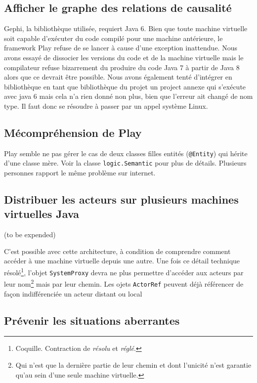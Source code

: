 \documentclass[11pt]{article}
\begin{document}
\subsection{Afficher le graphe des relations de causalité} Gephi, la bibliothèque utilisée, requiert Java 6. Bien que toute machine virtuelle soit capable d'exécuter du code compilé pour une machine antérieure, le framework Play refuse de se lancer à cause d'une exception inattendue.
Nous avons essayé de dissocier les versions du code et de la machine virtuelle mais le compilateur refuse bizarrement du produire du code Java 7 à partir de Java 8 alors que ce devrait être possible. Nous avons également tenté d'intégrer en bibliothèque en tant que bibliothèque du projet un project annexe qui s'exécute avec java 6 mais cela n'a rien donné non plus, bien que l'erreur ait changé de nom type. Il faut donc se résoudre à passer par un appel système Linux.

\subsection{Mécompréhension de Play} Play semble ne pas gérer le cas de deux classes filles entités (\texttt{@Entity}) qui hérite d'une classe mère. Voir la classe \texttt{logic.Semantic} pour plus de détails. Plusieurs personnes rapport le même problème sur internet.

\subsection{Distribuer les acteurs sur plusieurs machines virtuelles Java}

(to be expended)

C'est possible avec cette architecture, à condition de comprendre comment accéder à une machine virtuelle depuis une autre. Une fois ce détail technique résolé\footnote{Coquille. Contraction de \textsl{résolu} et \textsl{réglé}.}, l'objet \texttt{SystemProxy} devra ne plus permettre d'accéder aux acteurs par leur nom\footnote{Qui n'est que la dernière partie de leur chemin et dont l'unicité n'est garantie qu'au sein d'une seule machine virtuelle.} mais par leur chemin. Les ojets \texttt{ActorRef} peuvent déjà référencer de façon indifférenciée un acteur distant ou local

\subsection{Prévenir les situations aberrantes}
\end{document}
